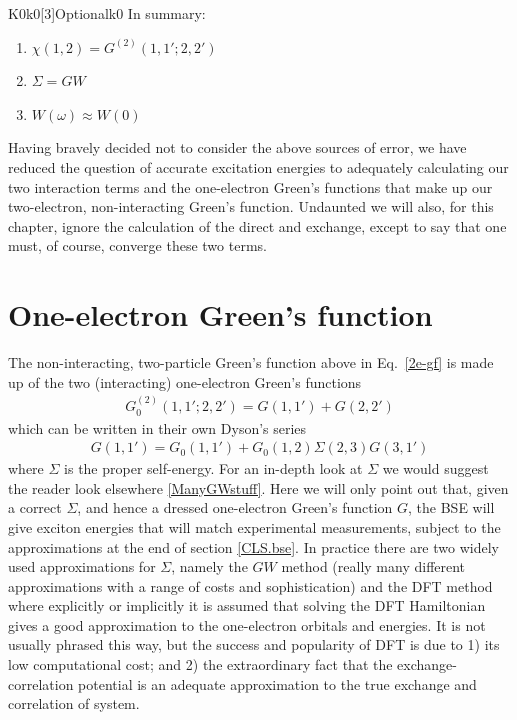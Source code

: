 \documentclass[11pt]{report}
\begin{document}
\begin{Card}{K0}{k0[3]}{Optional}{k0}
In summary:
\begin{enumerate}
\item{ $\chi(1,2) = G^{(2)}(1,1';2,2')$ }
\item{ $\Sigma = GW$ }
\item{ $W(\omega) \approx W(0)$ }
\end{enumerate}
Having bravely decided not to consider the above sources of error, we have reduced the question of accurate excitation energies to adequately calculating our two interaction terms and the one-electron Green's functions that make up our two-electron, non-interacting Green's function.
Undaunted we will also, for this chapter, ignore the calculation of the direct and exchange, except to say that one must, of course, converge these two terms.

\section{One-electron Green's function}

The non-interacting, two-particle Green's function above in Eq.~\ref{2e-gf} is made up of the two (interacting) one-electron Green's functions
\begin{align}
G_0^{(2)}(1,1';2,2') = G(1,1') + G(2,2') 
\end{align}
which can be written in their own Dyson's series
\begin{align} 
G(1,1') = G_0(1,1') + G_0(1,2) \Sigma(2,3) G(3,1')
\end{align}
where $\Sigma$ is the proper self-energy.
For an in-depth look at $\Sigma$ we would suggest the reader look elsewhere \ref{ManyGWstuff}.
Here we will only point out that, given a correct $\Sigma$, and hence a dressed one-electron Green's function $G$, the BSE will give exciton energies that will match experimental measurements, subject to the approximations at the end of section \ref{CLS.bse}. 
In practice there are two widely used approximations for $\Sigma$, namely the $GW$ method (really many different approximations with a range of costs and sophistication) and the DFT method where explicitly or implicitly it is assumed that solving the DFT Hamiltonian gives a good approximation to the one-electron orbitals and energies.
It is not usually phrased this way, but the success and popularity of DFT is due to 1) its low computational cost; and 2) the extraordinary fact that the exchange-correlation potential is an adequate approximation to the true exchange and correlation of system. 


\end{Card}
\end{document}
